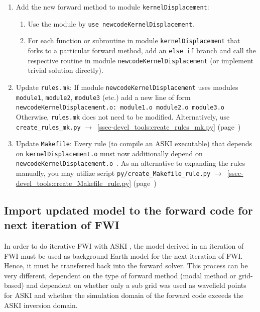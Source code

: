 \documentclass[12pt,a4paper]{article}
\newcommand{\lcode}[1]{\nolinkurl{#1}}
\newcommand{\ASKI}{ {\ttfamily ASKI} }
\newcommand{\myaref}[1]{$\rightarrow$~\ref{#1} (page~\pageref{#1})}
\begin{document}
\begin{enumerate}
\begin{enumerate}
  \end{enumerate}
\item Add the new forward method to module \lcode{kernelDisplacement}:
  \begin{enumerate}
  \item Use the module by \lcode{use newcodeKernelDisplacement}.
  \item For each function or subroutine in module \lcode{kernelDisplacement} that forks to a particular 
    forward method, add an \lcode{else if} branch and call the respective routine in module 
    \lcode{newcodeKernelDisplacement} (or implement trivial solution directly).
  \end{enumerate}
\item Update \lcode{rules.mk}:
  If module \lcode{newcodeKernelDisplacement} uses modules \lcode{module1}, \lcode{module2}, \lcode{module3} (etc.)
  add a new line of form \\
  \lcode{newcodeKernelDisplacement.o: module1.o module2.o module3.o}\\
  Otherwise, \lcode{rules.mk} does not need to be modified.
  Alternatively, use \lcode{create_rules_mk.py} \myaref{ssec-devel_tools:create_rules_mk.py}
\item Update \lcode{Makefile}: Every rule (to compile an \ASKI{} executable) that depends on 
  \lcode{kernelDisplacement.o} must now additionally depend on \lcode{newcodeKernelDisplacement.o}~.
  As an alternative to expanding the rules manually, you may utilize script \lcode{py/create_Makefile_rule.py}
  \myaref{ssec-devel_tools:create_Makefile_rule.py}
\end{enumerate}

\subsection{Import updated model to the forward code for next iteration of FWI} \label{ssec-extend:forward_import}
In order to do iterative FWI with \ASKI{}, the model derived in an iteration of FWI must be used as background 
Earth model for the next iteration of FWI. Hence, it must be transferred back into the forward solver. 
This process can be very different, dependent on the type of forward method (modal method or grid-based) and 
dependent on whether only a sub grid was used as wavefield points for \ASKI{} and whether the simulation domain
of the forward code exceeds the \ASKI{} inversion domain.
\end{document}
